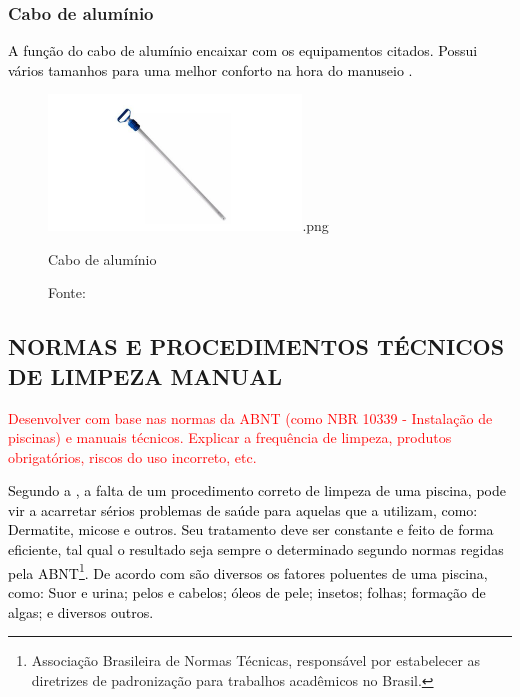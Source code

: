         \subsubsection*{Cabo de alumínio}

         \textcolor{black}{A função do cabo de alumínio encaixar com os equipamentos citados. Possui vários tamanhos para uma melhor conforto na hora do manuseio \cite{benedito2024projeto}.}

            \begin{figure}[H]
                \centering
                \caption{ }  
                \centering
                \label{fig:cont}
                \includegraphics[width=0.60\textwidth]{imagens/cabo}.png
                \caption*{Cabo de alumínio}
                \caption*{Fonte: \cite{benedito2024projeto}}
            \end{figure}
        

    \subsection{NORMAS E PROCEDIMENTOS TÉCNICOS DE LIMPEZA MANUAL}

       \textcolor{red}{Desenvolver com base nas normas da ABNT (como NBR 10339 - Instalação de piscinas) e manuais técnicos. Explicar a frequência de limpeza, produtos obrigatórios, riscos do uso incorreto, etc.}

       \textcolor{black}{Segundo a \cite{piscineiroProfissional}, a falta de um procedimento correto de limpeza de uma piscina, pode vir a acarretar sérios problemas de saúde para aquelas que a utilizam, como: Dermatite, micose e outros. Seu tratamento deve ser constante e feito de forma eficiente, tal qual o resultado seja sempre o determinado segundo normas regidas pela ABNT\footnote{Associação Brasileira de Normas Técnicas, responsável por estabelecer as diretrizes de padronização para trabalhos acadêmicos no Brasil.}. De acordo com \cite{guiaTratamento} são diversos os fatores poluentes de uma piscina, como: Suor e urina; pelos e cabelos; óleos de pele; insetos; folhas; formação de algas; e diversos outros.}

